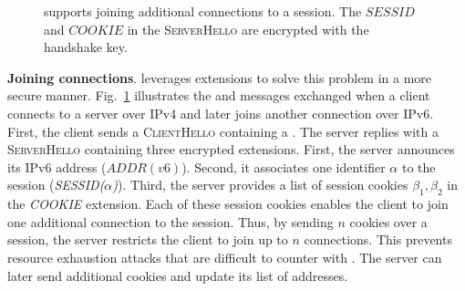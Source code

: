 \begin{figure}[!t]
	\centering
	\caption{\tcpls supports joining additional \tcp
		connections to a \tcpls session. The $SESSID$ and $COOKIE$ in the \textmd{\textsc{ServerHello}} are encrypted with the
		handshake key.}
	\label{fig:join-example}
\end{figure}

\textbf{Joining \tcp connections}. \tcpls leverages \tls extensions to solve this problem in a more secure manner. Fig.~\ref{fig:join-example} illustrates the \tls and \tcpls messages exchanged when a client connects to a server over IPv4 and later joins another connection over IPv6. First, the client sends a \textsc{ClientHello} containing a \hello. The server replies with a \textsc{ServerHello} containing three encrypted extensions. First, the server announces its IPv6 address ($ADDR(v6)$). Second, it associates one identifier $\alpha$ to the \tcpls session (\emph{SESSID($\alpha$)}).
Third, the server provides a list of \tcpls session cookies $\beta_1,\beta_2$ in the \emph{COOKIE} extension. Each of these session cookies enables the client
to join one additional \tcp connection to the \tcpls session. Thus, by sending $n$ cookies over a session, the server restricts the client to join up to $n$ \tcp connections. This prevents resource exhaustion attacks that are difficult to counter with \mptcp. The server can later send additional cookies and update its list of addresses.

